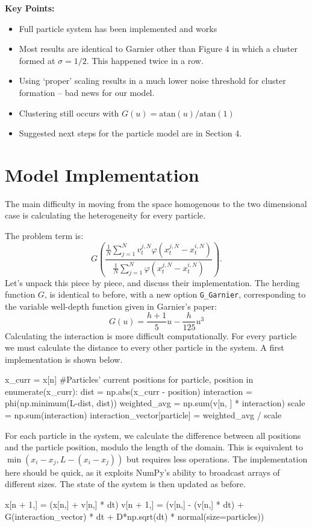 \documentclass[11pt,a4paper, final, dvipsnames]{article}
\begin{document}
    {\large \textbf{Key Points:}}
    \begin{itemize}
        \item Full particle system has been implemented and works
        \item Most results are identical to Garnier other than Figure 4 in which a cluster formed at $\sigma = 1/2$. This happened twice in a row.
        \item Using `proper' scaling results in a much lower noise threshold for cluster formation -- bad news for our model.
        \item Clustering still occurs with $G(u) = \mathrm{atan}(u)/\mathrm{atan}(1)$ 
        \item Suggested next steps for the particle model are in Section 4.
    \end{itemize}
    \section{Model Implementation}
        The main difficulty in moving from the space homogenous to the two dimensional case is calculating the heterogeneity for every particle.
        
        The problem term is:
        \begin{equation}\label{interaction}
            G\left(\frac{\frac{1}{N}\sum_{j=1}^N v_t^{j,N}\varphi(x^{j,N}_t-x^{i,N}_t)}{\frac{1}{N}\sum_{j=1}^N \varphi(x^{j,N}_t-x^{i,N}_t)}\right).
        \end{equation}
        Let's unpack this piece by piece, and discuss their implementation. The herding function $G$, is identical to before, with a new option \texttt{G\_Garnier}, corresponding to the variable well-depth function given in Garnier's paper:
        $$G(u) = \frac{h+1}{5}u - \frac{h}{125} u^3$$
        Calculating the interaction is more difficult computationally. For every particle we must calculate the distance to every other particle in the system. A first implementation is shown below.

\begin{python}
x_curr = x[n] #Particles' current positions
for particle, position in enumerate(x_curr):
   dist = np.abs(x_curr - position)
   interaction = phi(np.minimum(L-dist, dist))
   weighted_avg = np.sum(v[n, ] * interaction)
   scale = np.sum(interaction)
   interaction_vector[particle] = weighted_avg / scale
\end{python}
        For each particle in the system, we calculate the difference between all positions and the particle position, modulo the length of the domain. This is equivalent to $\min(x_i-x_j, L-(x_i-x_j))$ but requires less operations. The implementation here should be quick, as it exploits NumPy's ability to broadcast arrays of different sizes. The state of the system is then updated as before.
        \begin{python}
x[n + 1,] = (x[n,] + v[n,] * dt) %
v[n + 1,] = (v[n,] - (v[n,] * dt) + G(interaction_vector) * dt
            + D*np.sqrt(dt) * normal(size=particles))
        \end{python}
        
\end{document}
